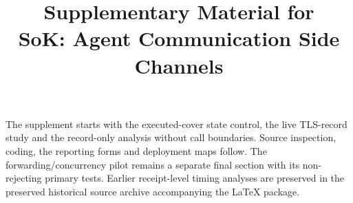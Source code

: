 \documentclass[conference,compsoc]{IEEEtran}
\title{Supplementary Material for\\SoK: Agent Communication Side Channels}
\author{}
\begin{document}

\raggedbottom
\pagestyle{plain}
\maketitle
\thispagestyle{plain}
\noindent The supplement starts with the executed-cover state control, the live TLS-record study and the record-only analysis without call boundaries. Source inspection, coding, the reporting forms and deployment maps follow. The forwarding/concurrency pilot remains a separate final section with its non-rejecting primary tests. Earlier receipt-level timing analyses are preserved in the preserved historical source archive accompanying the LaTeX package.

\clearpage
\clearpage
\clearpage\onecolumn\twocolumn






\clearpage
\clearpage\onecolumn\twocolumn


\end{document}
